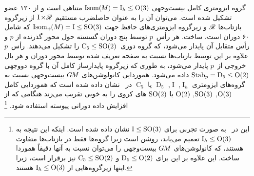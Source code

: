 گروه ایزومتری کامل بیست‌وجهی $\operatorname{Isom}(\mkern-1.5mu M \mkern-.5mu) = \operatorname{I}_h \leq \operatorname{O}(3)$ متناهی است و از ۱۲۰ عضو تشکیل شده است.
می‌توان آن را به عنوان حاصلضرب مستقیم $\operatorname{I} \times \mathscr{R}$ از زیرگروه بازتاب‌ها $\mathscr{R}$ و زیرگروه ایزومتری‌های حافظ جهت $\operatorname{Isom}_+\mkern-2mu(M) = \operatorname{I} \leq \operatorname{SO}(3)$ که شامل ۶۰ دوران است، ساخت.
هر رأس~$p$ توسط پنج دوران گسسته حول محور گذرنده از $p$ و رأس متقابل آن پایدار می‌شود، که گروه دوری~$\operatorname{C}_5 \leq \operatorname{SO}(2)$ را تشکیل می‌دهند.
رأس~$p$ علاوه بر این توسط بازتاب‌ها نسبت به صفحه تعریف شده توسط محور دوران و هر یال خروجی از~$p$ پایدار می‌شود، به طوری که زیرگروه پایدارساز کامل آن با گروه دووجهی $\operatorname{Stab}_{p} = \operatorname{D}_5 \leq \operatorname{O}(2)$ داده می‌شود.
هموردایی کانولوشن‌های $G\mkern-1.4muM$ بیست‌وجهی نسبت به گروه‌های ایزومتری $\operatorname{I}_h$, $\operatorname{I}$, $\operatorname{D}_5$ یا $\operatorname{C}_5$ در~\cite{gaugeIco2019} نشان داده شده است که هموردایی کامل $\operatorname{O}(3)$, $\operatorname{SO}(3)$, $\operatorname{O}(2)$ یا $\operatorname{SO}(2)$ های کروی را به خوبی تقریب می‌زند هنگامی که از افزایش داده دورانی پیوسته استفاده شود.%
\footnote{
	این در~\cite{gaugeIco2019} به صورت تجربی برای $\operatorname{I} \leq \operatorname{SO}(3)$ نشان داده شده است.
	اینکه این نتیجه به $\operatorname{I}_h \leq \operatorname{O}(3)$ تعمیم می‌یابد، روشن است زیرا گروه‌ها فقط در بازتاب‌ها متفاوت هستند، که کانولوشن‌های $G\mkern-1.4muM$ بیست‌وجهی را می‌توان نسبت به آنها دقیقاً هموردا ساخت.
	این علاوه بر این برای $\operatorname{D}_5 \leq \operatorname{O}(2)$ و $\operatorname{C}_5 \leq \operatorname{SO}(2)$ نیز برقرار است، زیرا اینها زیرگروه‌هایی از $\operatorname{I}_h \leq \operatorname{O}(3)$ هستند.
}


